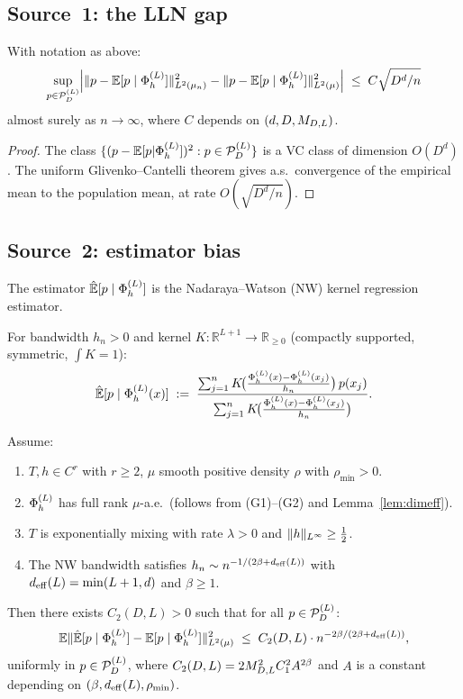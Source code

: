 \subsection{Source~1: the LLN gap}
\label{subsec:source1}

\begin{lemma}
\label{lem:source1}
With notation as above:
\[
  \sup_{p \in \mathcal{P}_D^{(L)}}
  \Bigl|
    \|p - \mathbb{E}[p \mid \Phi_h^{(L)}]\|_{L^{2}(\mu_n)}^2
    - \|p - \mathbb{E}[p \mid \Phi_h^{(L)}]\|_{L^{2}(\mu)}^2
  \Bigr|
  \;\leq\; C\sqrt{D^d/n}
\]
almost surely as $n \to \infty$, where $C$ depends on $(d,D,M_{D,L})$.
\end{lemma}

\begin{proof}
The class $\{(p - \mathbb{E}[p|\Phi_h^{(L)}])^2 : p \in \mathcal{P}_D^{(L)}\}$ is a VC class
of dimension $O(D^d)$.
The uniform Glivenko--Cantelli theorem \cite{Gyorfi2002} gives a.s.\ convergence
of the empirical mean to the population mean, at rate $O(\sqrt{D^d/n})$.
\end{proof}

\subsection{Source~2: estimator bias}
\label{subsec:source2}

The estimator $\hat{\mathbb{E}}[p \mid \Phi_h^{(L)}]$ is the Nadaraya--Watson (NW) kernel
regression estimator.

\begin{definition}
\label{def:nw}
For bandwidth $h_n > 0$ and kernel $K : \mathbb{R}^{L+1} \to \mathbb{R}_{\geq 0}$
(compactly supported, symmetric, $\int K = 1$):
\[
  \Ehat[p \mid \PhiL(x)]
  \;:=\;
  \frac{\sum_{j=1}^n K\!\bigl(\tfrac{\PhiL(x)-\PhiL(x_j)}{h_n}\bigr)\,p(x_j)}%
       {\sum_{j=1}^n K\!\bigl(\tfrac{\PhiL(x)-\PhiL(x_j)}{h_n}\bigr)}.
\]
\end{definition}

\begin{proposition}
\label{prop:source2}
Assume:
\begin{enumerate}[label=(\roman*)]
  \item $T, h \in C^r$ with $r \geq 2$, $\mu$ smooth positive density $\rho$
        with $\rho_{\min} > 0$.
  \item $\Phi_h^{(L)}$ has full rank $\mu$-a.e.\ (follows from (G1)--(G2) and
        Lemma~\ref{lem:dimeff}).
  \item $T$ is exponentially mixing with rate $\lambda > 0$ and
        $\|h\|_{L^{\infty}} \geq \frac{1}{2}$.
  \item The NW bandwidth satisfies $h_n \sim n^{-1/(2\beta+d_{\mathrm{eff}}(L))}$
        with $d_{\mathrm{eff}}(L) = \min(L+1, d)$ and $\beta \geq 1$.
\end{enumerate}
Then there exists $C_2(D,L) > 0$ such that for all $p \in \mathcal{P}_D^{(L)}$:
\[
  \mathbb{E}\|\hat{\mathbb{E}}[p \mid \Phi_h^{(L)}] - \mathbb{E}[p \mid \Phi_h^{(L)}]\|_{L^{2}(\mu)}^2
  \;\leq\; C_2(D,L)\cdot n^{-2\beta/(2\beta+d_{\mathrm{eff}}(L))},
\]
uniformly in $p \in \mathcal{P}_D^{(L)}$, where $C_2(D,L) = 2M_{D,L}^2 C_1^2 A^{2\beta}$ and
$A$ is a constant depending on $(\beta, d_{\mathrm{eff}}(L), \rho_{\min})$.
\end{proposition}

